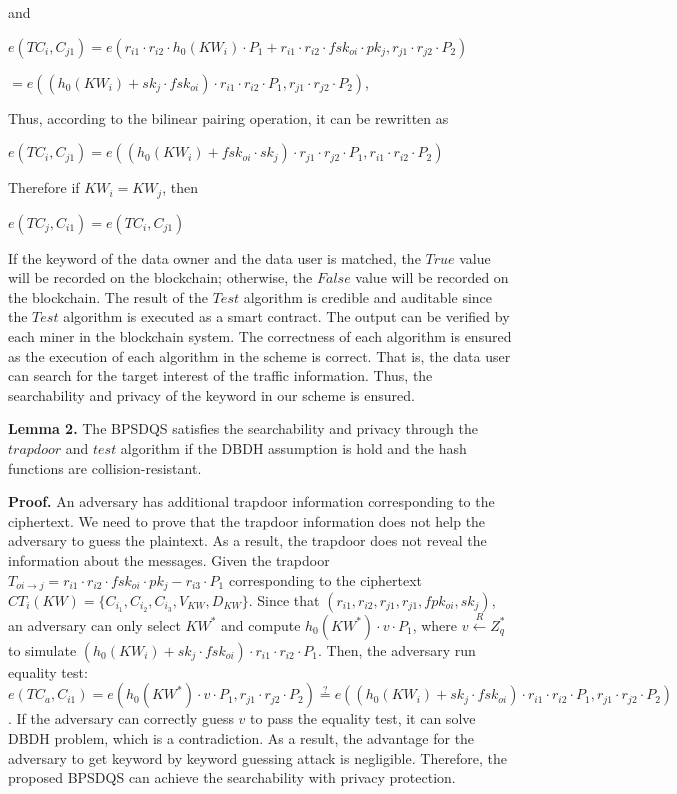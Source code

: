 \documentclass[journal]{IEEEtran}
\begin{document}
and

\begin{center}
$e(TC_i, C_{j1}) = e(r_{i1} \cdot r_{i2} \cdot h_0(KW_i) \cdot P_1 + r_{i1} \cdot r_{i2} \cdot fsk_{oi} \cdot pk_j, r_{j1} \cdot r_{j2} \cdot P_2)$

$= e((h_0(KW_i) + sk_j \cdot fsk_{oi}) \cdot r_{i1} \cdot r_{i2} \cdot P_1, r_{j1} \cdot r_{j2} \cdot P_2)$,
\end{center}

Thus, according to the bilinear pairing operation, it can be rewritten as

\begin{center}
$e(TC_i, C_{j1})= e((h_0(KW_i) + fsk_{oi} \cdot sk_j) \cdot r_{j1} \cdot r_{j2} \cdot P_1, r_{i1} \cdot r_{i2} \cdot P_2)$
\end{center}
Therefore if $KW_i = KW_j$, then
\begin{center}
$e(TC_j, C_{i1}) = e(TC_i, C_{j1})$
\end{center}


    If the keyword of the data owner and the data user is matched, the $True$ value will be recorded on the blockchain; otherwise, the $False$ value will be recorded on the blockchain. The result of the $Test$ algorithm is credible and auditable since the $Test$ algorithm is executed as a smart contract. The output can be verified by each miner in the blockchain system. The correctness of each algorithm is ensured as the execution of each algorithm in the scheme is correct. That is, the data user can search for the target interest of the traffic information. Thus, the searchability and privacy of the keyword in our scheme is ensured.

    \textbf{Lemma 2.}
    The BPSDQS satisfies the searchability and privacy through the $trapdoor$ and $test$ algorithm if the DBDH assumption is hold and the hash functions are collision-resistant.

    \textbf{Proof.}
    An adversary has additional trapdoor information corresponding to the ciphertext. We need to prove that the trapdoor information does not help the adversary to guess the plaintext. As a result, the trapdoor does not reveal the information about the messages. Given the trapdoor $T_{oi \to j} = r_{i1} \cdot r_{i2} \cdot fsk_{oi} \cdot pk_j - r_{i3} \cdot P_1$ corresponding to the ciphertext $CT_i(KW)=\{C_{i_1}, C_{i_2}, C_{i_3}, V_{KW}, D_{KW}\}$. Since that $(r_{i1}, r_{i2}, r_{j1}, r_{j1}, fpk_{oi}, sk_{j})$, an adversary can only select $KW^*$ and compute $h_0(KW^*) \cdot v \cdot P_1$, where $v \xleftarrow{R} Z_q^*$ to simulate $(h_0(KW_i) + sk_j \cdot fsk_{oi}) \cdot r_{i1} \cdot r_{i2} \cdot P_1$. Then, the adversary run equality test: $e(TC_a, C_{i1}) = e(h_0(KW^*) \cdot v \cdot P_1, r_{j1} \cdot r_{j2} \cdot P_2) \overset{?}{=} e((h_0(KW_i) + sk_j \cdot fsk_{oi}) \cdot r_{i1} \cdot r_{i2} \cdot P_1, r_{j1} \cdot r_{j2} \cdot P_2)$. If the adversary can correctly guess $v$ to pass the equality test, it can solve DBDH problem, which is a contradiction. As a result, the advantage for the adversary to get keyword by keyword guessing attack is negligible. Therefore, the proposed BPSDQS can achieve the searchability with privacy protection.
\end{document}
